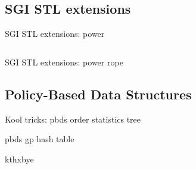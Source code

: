 \documentclass[12pt,notes,hyperref={unicode},aspectratio=169]{beamer}
\begin{document}
\subsection{SGI STL extensions}

\begin{frame}[fragile]{SGI STL extensions: power}
  \inputminted{c++}{power_modulo.cc}
\end{frame}

\begin{frame}{SGI STL extensions: power}
  rope
\end{frame}

\subsection{Policy-Based Data Structures}
\begin{frame}{Kool tricks: pbds order statistics tree}
\end{frame}

\begin{frame}{pbds gp hash table}
\end{frame}

\begin{frame}{kthxbye}
\end{frame}
\end{document}
